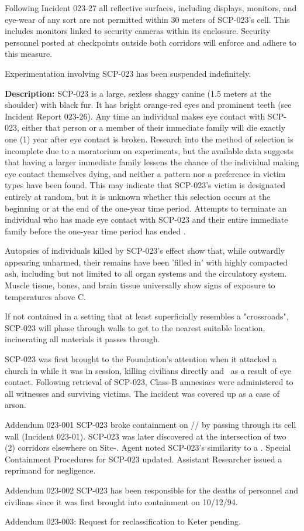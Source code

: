 Following Incident 023-27 all reflective surfaces, including displays, monitors, and eye-wear of any sort are not permitted within 30 meters of SCP-023's cell. This includes monitors linked to security cameras within its enclosure. Security personnel posted at checkpoints outside both corridors will enforce and adhere to this measure.

Experimentation involving SCP-023 has been suspended indefinitely.

\textbf{Description:} SCP-023 is a large, sexless shaggy canine (1.5 meters at the shoulder) with black fur. It has bright orange-red eyes and prominent teeth (see Incident Report 023-26). Any time an individual makes eye contact with SCP-023, either that person or a member of their immediate family will die exactly one (1) year after eye contact is broken. Research into the method of selection is incomplete due to a moratorium on experiments, but the available data suggests that having a larger immediate family lessens the chance of the individual making eye contact themselves dying, and neither a pattern nor a preference in victim types have been found. This may indicate that SCP-023's victim is designated entirely at random, but it is unknown whether this selection occurs at the beginning or at the end of the one-year time period. Attempts to terminate an individual who has made eye contact with SCP-023 and their entire immediate family before the one-year time period has ended \expunged.

Autopsies of individuals killed by SCP-023's effect show that, while outwardly appearing unharmed, their remains have been 'filled in' with highly compacted ash, including but not limited to all organ systems and the circulatory system. Muscle tissue, bones, and brain tissue universally show signs of exposure to temperatures above \degree C.

If not contained in a setting that at least superficially resembles a "crossroads", SCP-023 will phase through walls to get to the nearest suitable location, incinerating all materials it passes through.

SCP-023 was first brought to the Foundation's attention when it attacked a church in  while it was in session, killing  civilians directly and \redacted \ as a result of eye contact. Following retrieval of SCP-023, Class-B amnesiacs were administered to all witnesses and surviving victims. The incident was covered up as a case of arson.

Addendum 023-001
SCP-023 broke containment on // by passing through its cell wall (Incident 023-01). SCP-023 was later discovered at the intersection of two (2) corridors elsewhere on Site-. Agent  noted SCP-023's similarity to a \redacted. Special Containment Procedures for SCP-023 updated. Assistant Researcher  issued a reprimand for negligence.

Addendum 023-002
SCP-023 has been responsible for the deaths of  personnel and  civilians since it was first brought into containment on 10/12/94.

Addendum 023-003:
Request for reclassification to Keter pending.